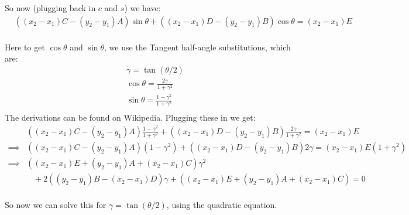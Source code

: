 \documentclass[11pt,english]{article}
\begin{document}
So now (plugging back in $c$ and $s$) we have:
\begin{align*}
& ((x_2-x_1)C-(y_2 - y_1)A) \sin\theta + ((x_2-x_1)D-(y_2 - y_1)B) \cos\theta = (x_2-x_1)E \\
\end{align*}

Here to get $\cos \theta$ and $\sin \theta$, we use the Tangent half-angle substitutions, which are:
\begin{align*}
& \gamma = \tan (\theta/2) \\
& \cos\theta = \frac{2\gamma}{1+\gamma^2} \\
& \sin\theta = \frac{1-\gamma^2}{1+\gamma^2} \\
\end{align*}
The derivations can be found on Wikipedia. Plugging these in we get: 
\begin{align*}
& ((x_2-x_1)C-(y_2 - y_1)A) \frac{1-\gamma^2}{1+\gamma^2} + ((x_2-x_1)D-(y_2 - y_1)B) \frac{2\gamma}{1+\gamma^2}
	= (x_2-x_1)E \\
\implies
& ((x_2-x_1)C-(y_2 - y_1)A) (1-\gamma^2) + ((x_2-x_1)D-(y_2 - y_1)B) 2\gamma
	= (x_2-x_1)E(1+\gamma^2) \\
\implies
&  ((x_2-x_1)E + (y_2 - y_1)A + (x_2-x_1)C)\gamma^2 \\
& \;\;\; + 2 ((y_2 - y_1)B-(x_2-x_1)D) \gamma + ((x_2-x_1)E + (y_2 - y_1)A + (x_2-x_1)C) = 0\\
\end{align*}

So now we can solve this for $\gamma = \tan(\theta/2)$, using the quadratic equation.


\end{document}
